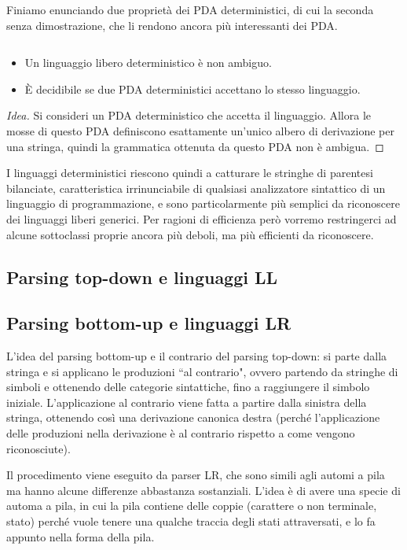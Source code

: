 \documentclass[12pt]{article}
\numberwithin{theorem}{subsection}
\begin{document}
Finiamo enunciando due proprietà dei PDA deterministici, di cui la seconda senza dimostrazione, che li rendono ancora più interessanti dei PDA.
\begin{prop}
	$ $
	
	\begin{itemize}
		\item Un linguaggio libero deterministico è non ambiguo.
		\item È decidibile se due PDA deterministici accettano lo stesso linguaggio.
	\end{itemize}
\end{prop}
\begin{proof}[Idea]
	Si consideri un PDA deterministico che accetta il linguaggio. Allora le mosse di questo PDA definiscono esattamente un'unico albero di derivazione per una stringa, quindi la grammatica ottenuta da questo PDA non è ambigua.
\end{proof}

I linguaggi deterministici riescono quindi a catturare le stringhe di parentesi bilanciate, caratteristica irrinunciabile di qualsiasi analizzatore sintattico di un linguaggio di programmazione, e sono particolarmente più semplici da riconoscere dei linguaggi liberi generici. Per ragioni di efficienza però vorremo restringerci ad alcune sottoclassi proprie ancora più deboli, ma più efficienti da riconoscere.

\subsection{Parsing top-down e linguaggi LL}

\subsection{Parsing bottom-up e linguaggi LR}
L'idea del parsing bottom-up e il contrario del parsing top-down: si parte dalla stringa e si applicano le produzioni ``al contrario", ovvero partendo da stringhe di simboli e ottenendo delle categorie sintattiche, fino a raggiungere il simbolo iniziale. L'applicazione al contrario viene fatta a partire dalla sinistra della stringa, ottenendo così una derivazione canonica destra (perché l'applicazione delle produzioni nella derivazione è al contrario rispetto a come vengono riconosciute).

Il procedimento viene eseguito da parser LR, che sono simili agli automi a pila ma hanno alcune differenze abbastanza sostanziali. L'idea è di avere una specie di automa a pila, in cui la pila contiene delle coppie (carattere o non terminale, stato) perché vuole tenere una qualche traccia degli stati attraversati, e lo fa appunto nella forma della pila.
\end{document}
